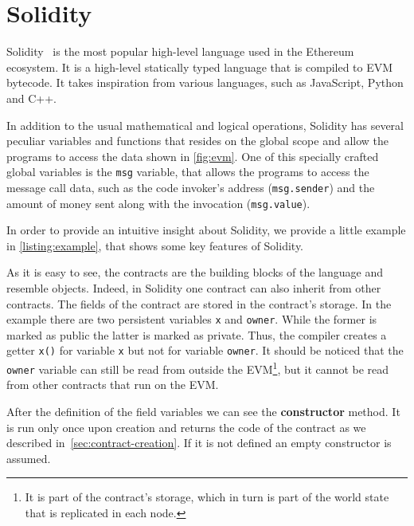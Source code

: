 \section{Solidity}
\label{sec:solidity}
Solidity~\cite{bib:solidity-docs} is the most popular
high-level language used in the Ethereum ecosystem.
It is a high-level statically typed language that is compiled to EVM bytecode.
It takes inspiration from various languages, such as JavaScript, Python and C++.

In addition to the usual mathematical and logical operations, Solidity has
several peculiar variables and functions that resides on the global scope and
allow the programs to access the data shown in \autoref{fig:evm}.
One of this specially crafted global variables is the \texttt{msg} variable,
that allows the programs to access the message call data,
such as the code invoker's address (\texttt{msg.sender}) and the amount of
money sent along with the invocation (\texttt{msg.value}).

In order to provide an intuitive insight about Solidity, we provide a little
example in \autoref{listing:example}, that shows some key features of Solidity.

\begin{figure}[!h]

\end{figure}

As it is easy to see, the contracts are the building blocks of the language and
resemble objects. Indeed, in Solidity one contract can also inherit from other
contracts.
The fields of the contract are stored in the contract's storage. In the example
there are two persistent variables \verb|x| and \verb|owner|. While the former
is marked as public the latter is marked as private. Thus, the compiler
creates a getter \verb|x()| for variable \verb|x| but not for variable
\verb|owner|. It should be noticed that the \verb|owner| variable can still
be read from outside the EVM\footnote{It is part of the contract's storage,
which in turn is part of the world state that is replicated in each node.},
but it cannot be read from other contracts that run on the EVM.


After the definition of the field variables we can see the \textbf{constructor}
method. It is run only once upon creation and returns the code of the contract
as we described in~\autoref{sec:contract-creation}. If it is not defined
an empty constructor is assumed.

